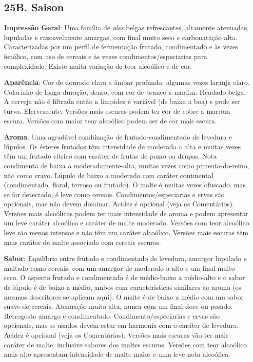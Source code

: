 \subsection*{25B. Saison}
\textbf{Impressão Geral}: Uma família de \textit{ales} belgas refrescantes, altamente atenuadas, lupuladas e razoavelmente amargas, com final muito seco e carbonatação alta. Caracterizadas por um perfil de fermentação frutado, condimentado e às vezes fenólico, com uso de cereais e às vezes condimentos/especiarias para complexidade. Existe muita variação de teor alcoólico e de cor.

\textbf{Aparência}: Cor de dourado claro a âmbar profundo, algumas vezes laranja claro. Colarinho de longa duração, denso, com cor de branco a marfim. Rendado belga. A cerveja não é filtrada então a limpidez é variável (de baixa a boa) e pode ser turva. Efervescente.
Versões mais escuras podem ter cor de cobre a marrom escura. Versões com maior teor alcoólico podem ser de cor mais escura.

\textbf{Aroma}: Uma agradável combinação de frutado-condimentado de levedura e lúpulos. Os ésteres frutados têm intensidade de moderada a alta e muitas vezes têm um frutado cítrico com caráter de frutas de pomo ou drupas. Nota condimenta de baixa a moderadamente-alta, muitas vezes como pimenta-do-reino, não como cravo. Lúpulo de baixo a moderado com caráter continental (condimentado, floral, terroso ou frutado). O malte é muitas vezes ofuscado, mas se for detectado, é leve como cereais. Condimentos/especiarias e ervas são opcionais, mas não devem dominar. Acidez é opcional (veja os Comentários).
Versões mais alcoólicas podem ter mais intensidade de aroma e podem apresentar um leve caráter alcoólico e caráter de malte moderado. Versões com teor alcoólico leve são menos intensas e não têm um caráter alcoólico. Versões mais escuras têm mais caráter de malte associado com cereais escuros.

\textbf{Sabor}: Equilíbrio entre frutado e condimentado de levedura, amargor lupulado e maltado como cereais, com um amargor de moderado a alto e um final muito seco. O aspecto frutado e condimentado é de médio-baixo a médio-alto e o sabor de lúpulo é de baixo a médio, ambos com características similares ao aroma (os mesmos descritores se aplicam aqui). O malte é de baixo a médio com um sabor suave de cereais. Atenuação muito alta, nunca com um final doce ou pesado. Retrogosto amargo e condimentado. Condimento/especiarias e ervas são opcionais, mas se usados devem estar em harmonia com o caráter de levedura. Acidez é opcional (veja os Comentários).
Versões mais escuras vão ter mais caráter de malte, inclusive sabores dos maltes escuros. Versões com teor alcoólico mais alto apresentam intensidade de malte maior e uma leve nota alcoólica.

